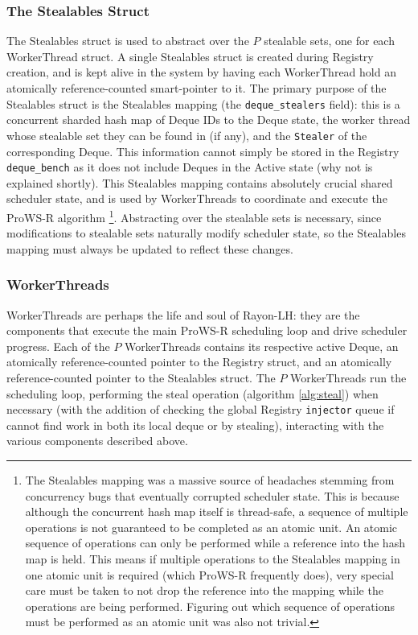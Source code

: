 \documentclass[bsc,frontabs,singlespacing,parskip,deptreport,normalheadings]{infthesis}
\begin{document}
\subsubsection*{The Stealables Struct}
\label{subsubsection:the_stealables_struct}

The Stealables struct is used to abstract over the \(P\) stealable sets, one for
each WorkerThread struct. A single Stealables struct is created during Registry
creation, and is kept alive in the system by having each WorkerThread hold an
atomically reference-counted smart-pointer to it. The primary purpose of the
Stealables struct is the Stealables mapping (the \texttt{deque\_stealers} field):
this is a concurrent sharded hash map of Deque IDs to the Deque state, the
worker thread whose stealable set they can be found in (if any), and the \texttt{Stealer}
of the corresponding Deque. This information cannot simply be stored in the
Registry \texttt{deque\_bench} as it does not include Deques in the Active state
(why not is explained shortly). This Stealables mapping contains absolutely
crucial shared scheduler state, and is used by WorkerThreads to coordinate and
execute the ProWS-R algorithm \footnote{The Stealables mapping was a massive
source of headaches stemming from concurrency bugs that eventually corrupted
scheduler state. This is because although the concurrent hash map itself is thread-safe,
a sequence of multiple operations is not guaranteed to be completed as an atomic
unit. An atomic sequence of operations can only be performed while a reference
into the hash map is held. This means if multiple operations to the Stealables
mapping in one atomic unit is required (which ProWS-R frequently does), very
special care must be taken to not drop the reference into the mapping while the
operations are being performed. Figuring out which sequence of operations must
be performed as an atomic unit was also not trivial.}. Abstracting over the
stealable sets is necessary, since modifications to stealable sets naturally
modify scheduler state, so the Stealables mapping must always be updated to
reflect these changes.

\subsubsection*{WorkerThreads}

WorkerThreads are perhaps the life and soul of Rayon-LH: they are the components
that execute the main ProWS-R scheduling loop and drive scheduler progress. Each
of the \(P\) WorkerThreads contains its respective active Deque, an atomically
reference-counted pointer to the Registry struct, and an atomically
reference-counted pointer to the Stealables struct. The \(P\) WorkerThreads run
the scheduling loop, performing the steal operation (algorithm \ref{alg:steal})
when necessary (with the addition of checking the global Registry
\texttt{injector} queue if cannot find work in both its local deque or by
stealing), interacting with the various components described above.
\end{document}
